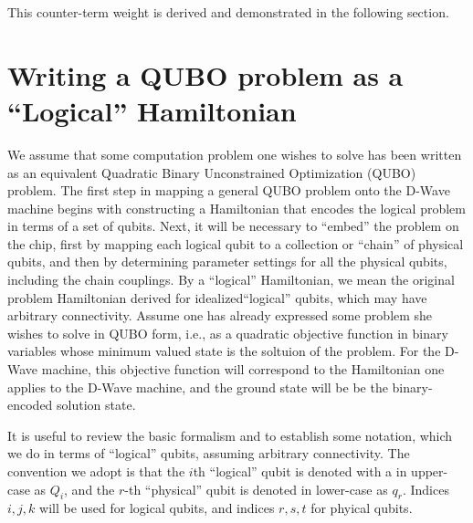 \documentclass[preprint,12pt,eqsecnum,nofootinbib,amsmath,amssymb]{revtex4}
\begin{document}
This counter-term weight is derived and demonstrated in the following section.

\section{Writing a QUBO problem as a ``Logical'' Hamiltonian}

We assume that some computation problem one wishes to solve has been written as an equivalent 
Quadratic Binary Unconstrained Optimization (QUBO) problem.
The first step in mapping a general QUBO problem onto the D-Wave machine begins with constructing 
a Hamiltonian that encodes the logical problem in terms of a set of qubits. Next, it will 
be necessary to ``embed'' the problem on  the chip, first by mapping each logical qubit to 
a collection or ``chain'' of physical qubits, and then by determining parameter settings for 
all the physical qubits, including the chain couplings. By a ``logical'' Hamiltonian, we mean 
the original problem Hamiltonian derived for idealized``logical'' qubits, which may have arbitrary 
connectivity. Assume one has already expressed some problem she wishes to solve in QUBO form, i.e., 
as a quadratic objective function in binary variables whose minimum valued state is the soltuion 
of the problem. For the D-Wave machine, this objective function will correspond to the Hamiltonian 
one applies to the D-Wave machine, and the ground state will be be the binary-encoded solution state.



It is useful to review the basic formalism and to establish some notation, which we do
in terms of ``logical'' qubits, assuming arbitrary connectivity. The convention we adopt is that the 
$i$th ``logical'' qubit is denoted with a in upper-case as $Q_i$, and the $r$-th ``physical'' qubit 
is denoted in lower-case as $q_r$. Indices $i,j,k$ will be used for logical qubits, and indices $r,s,t$ 
for phyical qubits. 
\end{document}
